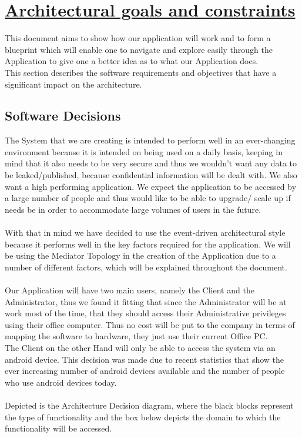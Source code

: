\documentclass{article}
\begin{document}
\section{\underline{Architectural goals and constraints}}
This document aims to show how our application will work and to form a blueprint which will enable one to navigate and explore easily through the Application to give one a better idea as to what our Application does.\\ This section describes the software requirements and objectives that have a significant impact on the architecture.

\subsection{Software Decisions}
The System that we are creating is intended to perform well in an ever-changing environment because it is intended on being used on a daily basis, keeping in mind that it also needs to be very secure and thus we wouldn't want any data to be leaked/published, because confidential information will be dealt with. We also want a high performing application. We expect the application to be accessed by a large number of people and thus would like to be able to upgrade/ scale up if needs be in order to accommodate large volumes of users in the future.\\\\ With that in mind we have decided to use the event-driven architectural style because it performs well in the key factors required for the application. We will be using the Mediator Topology in the creation of the Application due to a number of different factors, which will be explained throughout the document.\\\\ Our Application will have two main users, namely the Client and the Administrator, thus we found it fitting that since the Administrator will be at work most of the time, that they should access their Administrative privileges using their office computer. Thus no cost will be put to the company in terms of mapping the software to hardware, they just use their current Office PC.\\ The Client on the other Hand will only be able to access the system via an android device. This decision was made due to recent statistics that show the ever increasing number of android devices available and the number of people who use android devices today.\\\\ Depicted is the Architecture Decision diagram, where the black blocks represent the type of functionality and the box below depicts the domain to which the functionality will be accessed.
\end{document}
